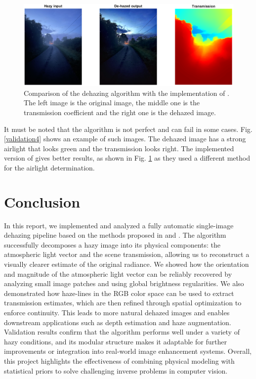 \documentclass[conference]{IEEEtran}
\begin{document}
\begin{figure}
    \centering
    \includegraphics[width=\linewidth]{img/validation5.png}
    \caption{Comparison of the dehazing algorithm with the implementation of \cite{github}. The left image is the original image, the middle one is the transmission coefficient and the right one is the dehazed image.}
    \label{validation5}
\end{figure}

It must be noted that the algorithm is not perfect and can fail in some cases. Fig. \ref{validation4} shows an example of such images. The dehazed image has a strong airlight that looks green and the transmission looks right. The implemented version of \cite{github} gives better results, as shown in Fig. \ref{validation5} as they used a different method for the airlight determination.

\section{Conclusion}

In this report, we implemented and analyzed a fully automatic single-image dehazing pipeline based on the methods proposed in \cite{airlight} and \cite{dehaze}. The algorithm successfully decomposes a hazy image into its physical components: the atmospheric light vector and the scene transmission, allowing us to reconstruct a visually clearer estimate of the original radiance.
We showed how the orientation and magnitude of the atmospheric light vector can be reliably recovered by analyzing small image patches and using global brightness regularities. We also demonstrated how haze-lines in the RGB color space can be used to extract transmission estimates, which are then refined through spatial optimization to enforce continuity. This leads to more natural dehazed images and enables downstream applications such as depth estimation and haze augmentation.
Validation results confirm that the algorithm performs well under a variety of hazy conditions, and its modular structure makes it adaptable for further improvements or integration into real-world image enhancement systems. Overall, this project highlights the effectiveness of combining physical modeling with statistical priors to solve challenging inverse problems in computer vision.
\end{document}
